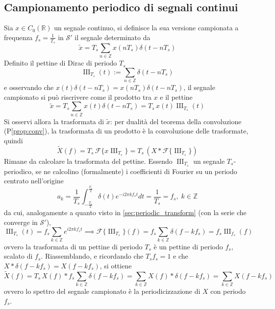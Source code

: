     \subsection{Campionamento periodico di segnali continui}
        Sia $x \in C_{0}(\mathbb{R})$ un segnale continuo, si definisce la sua versione campionata a frequenza $f_s = \frac{1}{T_s}$ in $\mathcal{S}'$ il segnale determinato da
        \[
            \tilde x = T_{s} \sum_{n \in \mathbb{Z}} x(n T_s) \delta(t - n T_s)
        \]
        Definito il pettine di Dirac di periodo $T_s$
        \[
            \operatorname{III}_{T_s}(t) := \sum_{n \in \mathbb{Z}} \delta(t - n T_s)
        \]
        e osservando che $x(t) \delta(t - n T_s) = x(n T_s) \delta(t - n T_s)$, il segnale campionato si può riscrivere come il prodotto tra $x$ e il pettine
        \[
            \tilde x = T_s \sum_{n \in \mathbb{Z}} x(t) \delta(t - n T_s) = T_s \, x(t) \operatorname{III}_{T_s}(t)
        \]
        Si osservi allora la trasformata di $\tilde x$: per dualità del teorema della convoluzione (P\ref{prop:conv}), la trasformata di un prodotto è la convoluzione delle trasformate, quindi
        \[
            \tilde X(f) = T_s \, \mathcal{F}\{ x \operatorname{III}_{T_s} \} = T_s \, (X * \mathcal{F}\{ \operatorname{III}_{T_s} \})
        \]
        Rimane da calcolare la trasformata del pettine.
        Essendo $\operatorname{III}_{T_s}$ un segnale $T_s$-periodico, se ne calcolino (formalmente) i coefficienti di Fourier su un periodo centrato nell'origine
        \[
            a_k = \frac{1}{T_s} \int_{-\frac{T_s}{2}}^{\frac{T_s}{2}} \delta(t) e^{-i 2 \pi k f_s t} dt = \frac{1}{T_s} = f_s, \; k \in \mathbb{Z}
        \]
        da cui, analogamente a quanto visto in \cref{sec:periodic_transform} (con la serie che converge in $\mathcal{S}'$),
        \[
            \operatorname{III}_{T_s}(t) = f_s \sum_{k \in \mathbb{Z}} e^{i 2 \pi k f_s t}
            \implies
            \mathcal{F}\{ \operatorname{III}_{T_s} \}(f) = f_s \sum_{k \in \mathbb{Z}} \delta(f - k f_s) = f_s \operatorname{III}_{f_s}(f)
        \]
        ovvero la trasformata di un pettine di periodo $T_s$ è un pettine di periodo $f_s$, scalato di $f_s$.
        Riassemblando, e ricordando che $T_s f_s = 1$ e che $X * \delta(f - k f_s) = X(f - k f_s)$, si ottiene
        \[
            \tilde X(f) = T_s \, X(f) * f_s \sum_{k \in \mathbb{Z}} \delta(f - k f_s)
            = \sum_{k \in \mathbb{Z}} X(f) * \delta(f - k f_s)
            = \sum_{k \in \mathbb{Z}} X(f - k f_s)
        \]
        ovvero lo spettro del segnale campionato è la periodicizzazione di $X$ con periodo $f_s$.


